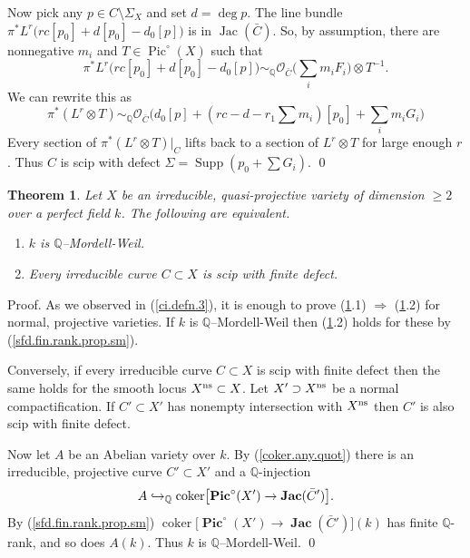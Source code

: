 \documentclass{amsart}
\newtheorem{thm}{Theorem}%
\theoremstyle{definition}
\theoremstyle{remark}
\renewcommand{\o}[0]{{\mathcal O}}
\newcommand{\q}[0]{{\mathbb Q}}
\newcommand{\pic}[0]{\operatorname{Pic}}
\newcommand{\pico}[0]{\operatorname{\mathbf{Pic}}^{\circ}}
\newcommand{\supp}[0]{\operatorname{Supp}}
\newcommand{\coker}[0]{\operatorname{coker}}
\newcommand{\jacs}[0]{\operatorname{\mathbf{Jac}}}
\newcommand{\jac}[0]{\operatorname{Jac}}
\newcommand{\simq}[0]{\sim_{\q}}
\newcommand{\tsum}[0]{\textstyle{\sum}}
\newcommand{\cond}[0]{\operatorname{cond}}
\def\into{\DOTSB\lhook\joinrel\to}
\begin{document}
Now pick any $p\in C\setminus \Sigma_X$ and
set $d=\deg p$. The line bundle
$\pi^*L^r\bigl(rc[p_0]+d[p_0]-d_0[p]\bigr)$ is in $\jac(\bar C) $. 
So, by assumption, there are
nonnegative $m_i$ and $T\in \pic^\circ(X)$ such that
$$
\pi^*L^r\bigl(rc[p_0]+d[p_0]-d_0[p]\bigr)\simq \o_{\bar C}\bigl(\tsum_i m_iF_i\bigr)\otimes T^{-1}.
$$
We can rewrite this as
$$
\pi^*(L^r\otimes T)\simq
\o_{\bar C}\bigl(d_0[p]+(rc-d-r_1\tsum m_i)[p_0]+\tsum_im_iG_i\bigr)
 $$
Every section of
$\pi^*(L^r\otimes T)|_C$ lifts back to a section of
$L^r\otimes T$ for large enough $r$. 
Thus $C$ is  scip  with   defect
$\Sigma=\supp(p_0+\tsum G_i)$. \qed


\begin{thm}\label{mor.wei.field.thm}
 Let $X$ be an irreducible, quasi-projective variety of dimension $\geq 2$ over a perfect field $k$. 
The following are equivalent.
\begin{enumerate}
\item $k$ is $\q$--Mordell-Weil.
\item Every irreducible curve  $C\subset X$ is scip with finite  defect.
\end{enumerate}
\end{thm}

Proof.  As we observed in (\ref{ci.defn.3}), it is enough to prove
(\ref{mor.wei.field.thm}.1) $\Rightarrow$ (\ref{mor.wei.field.thm}.2)
for normal, projective varieties.
If $k$ is $\q$--Mordell-Weil then (\ref{mor.wei.field.thm}.2) holds for these by (\ref{sfd.fin.rank.prop.sm}). 




Conversely, if every irreducible curve  $C\subset X$ is scip with finite  defect then the same holds for the smooth locus  $X^{\rm ns}\subset X$.
Let $X'\supset X^{\rm ns}$ be a normal compactification. If 
 $ C'\subset X'$ has nonempty intersection with $X^{\rm ns}$
then $C'$ is also scip with finite  defect.



Now let $A$ be an Abelian variety over $k$. By (\ref{coker.any.quot})   there is an  irreducible,  projective curve $ C'\subset  X'$ and a
$\q$-injection
$$
A\into_{\q}  \coker\bigl[ \pico( X')\to \jacs(\bar C')\bigr].
$$
By (\ref{sfd.fin.rank.prop.sm})  $\coker\bigl[ \pico(X')\to \jacs(\bar C')\bigr](k)$ has  finite $\q$-rank, and  so does $A(k)$. 
Thus $k$ is $\q$--Mordell-Weil. 
 \qed
 
\end{document}
